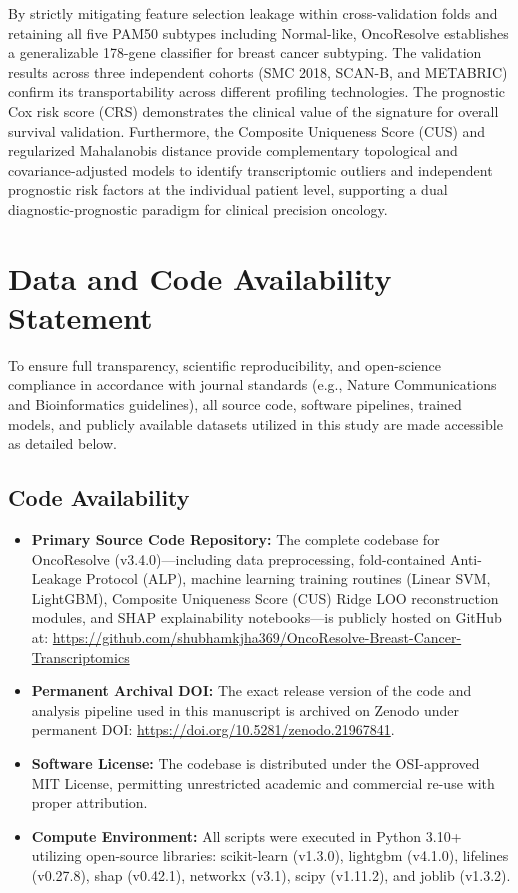 \documentclass[10pt,a4paper,twocolumn]{article}
\begin{document}
By strictly mitigating feature selection leakage within cross-validation folds and retaining all five PAM50 subtypes including Normal-like, OncoResolve establishes a generalizable 178-gene classifier for breast cancer subtyping. The validation results across three independent cohorts (SMC 2018, SCAN-B, and METABRIC) confirm its transportability across different profiling technologies. The prognostic Cox risk score (CRS) demonstrates the clinical value of the signature for overall survival validation. Furthermore, the Composite Uniqueness Score (CUS) and regularized Mahalanobis distance provide complementary topological and covariance-adjusted models to identify transcriptomic outliers and independent prognostic risk factors at the individual patient level, supporting a dual diagnostic-prognostic paradigm for clinical precision oncology.

\section{Data and Code Availability Statement}

To ensure full transparency, scientific reproducibility, and open-science compliance in accordance with journal standards (e.g., Nature Communications and Bioinformatics guidelines), all source code, software pipelines, trained models, and publicly available datasets utilized in this study are made accessible as detailed below.

\subsection{Code Availability}
\begin{itemize}
    \item \textbf{Primary Source Code Repository:} The complete codebase for OncoResolve (v3.4.0)---including data preprocessing, fold-contained Anti-Leakage Protocol (ALP), machine learning training routines (Linear SVM, LightGBM), Composite Uniqueness Score (CUS) Ridge LOO reconstruction modules, and SHAP explainability notebooks---is publicly hosted on GitHub at: \url{https://github.com/shubhamkjha369/OncoResolve-Breast-Cancer-Transcriptomics}
    \item \textbf{Permanent Archival DOI:} The exact release version of the code and analysis pipeline used in this manuscript is archived on Zenodo under permanent DOI: \url{https://doi.org/10.5281/zenodo.21967841}.
    \item \textbf{Software License:} The codebase is distributed under the OSI-approved MIT License, permitting unrestricted academic and commercial re-use with proper attribution.
    \item \textbf{Compute Environment:} All scripts were executed in Python 3.10+ utilizing open-source libraries: scikit-learn (v1.3.0), lightgbm (v4.1.0), lifelines (v0.27.8), shap (v0.42.1), networkx (v3.1), scipy (v1.11.2), and joblib (v1.3.2).
\end{itemize}
\end{document}

